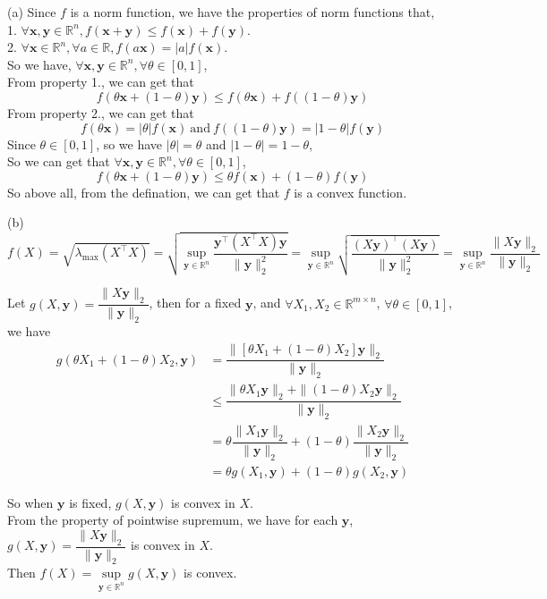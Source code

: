 (a) Since $f$ is a norm function, we have the properties of norm functions that,\\
1. $\forall \mathbf{x},\mathbf{y}\in \mathbb{R}^{n}, f(\mathbf{x}+\mathbf{y})\leq f(\mathbf{x})+f(\mathbf{y})$.\\
2. $\forall \mathbf{x}\in \mathbb{R}^{n}, \forall a \in \mathbb{R}, f(a\mathbf{x})=|a|f(\mathbf{x})$.\\
So we have, $\forall \mathbf{x},\mathbf{y}\in \mathbb{R}^{n}, \forall \theta \in [0,1]$,\\
From property 1., we can get that
$$f(\theta \mathbf{x}+(1-\theta)\mathbf{y})\leq f(\theta \mathbf{x})+f((1-\theta)\mathbf{y})$$
From property 2., we can get that
$$f(\theta \mathbf{x})=|\theta|f(\mathbf{x})\ \text{and}\ f((1-\theta)\mathbf{y})=|1-\theta|f(\mathbf{y})$$
Since $\theta \in [0,1]$, so we have $|\theta|=\theta$ and $|1-\theta|=1-\theta$,\\
So we can get that $\forall \mathbf{x},\mathbf{y}\in \mathbb{R}^{n}, \forall \theta \in [0,1]$,
$$f(\theta \mathbf{x}+(1-\theta)\mathbf{y})\leq \theta f(\mathbf{x})+(1-\theta)f(\mathbf{y})$$
So above all, from the defination, we can get that $f$ is a convex function.



(b) $f(X)=\sqrt{\lambda_{\max}(X^{\top}X)} = \sqrt{\sup\limits_{\mathbf{y}\in\mathbb{R}^n}\dfrac{\mathbf{y}^{\top}(X^{\top}X)\mathbf{y}}{\|\mathbf{y}\|_2^2}}= \sup\limits_{\mathbf{y}\in\mathbb{R}^n}\sqrt{\dfrac{(X\mathbf{y})^{\top}(X\mathbf{y})}{\|\mathbf{y}\|_2^2}} = \sup\limits_{\mathbf{y}\in\mathbb{R}^n}\dfrac{\|X\mathbf{y}\|_2}{\|\mathbf{y}\|_2}$

Let $g(X,\mathbf{y})=\dfrac{\|X\mathbf{y}\|_2}{\|\mathbf{y}\|_2}$, then for a fixed $\mathbf{y}$, and $\forall X_1, X_2\in\mathbb{R}^{m\times n}$, $\forall \theta\in[0,1]$, we have
\begin{align*}
g(\theta X_1+(1-\theta)X_2,\mathbf{y}) &= \dfrac{\|\left[\theta X_1+(1-\theta)X_2\right]\mathbf{y}\|_2}{\|\mathbf{y}\|_2} \\
&\leq \dfrac{\|\theta X_1\mathbf{y}\|_2+\|(1-\theta)X_2\mathbf{y}\|_2}{\|\mathbf{y}\|_2} \\
&= \theta\dfrac{\|X_1\mathbf{y}\|_2}{\|\mathbf{y}\|_2}+(1-\theta)\dfrac{\|X_2\mathbf{y}\|_2}{\|\mathbf{y}\|_2} \\
&= \theta g(X_1,\mathbf{y})+(1-\theta)g(X_2,\mathbf{y})
\end{align*}

So when $\mathbf{y}$ is fixed, $g(X,\mathbf{y})$ is convex in $X$.\\
From the property of pointwise supremum, we have for each $\mathbf{y}$, $g(X,\mathbf{y})=\dfrac{\|X\mathbf{y}\|_2}{\|\mathbf{y}\|_2}$ is convex in $X$. \\
Then $f(X)=\sup\limits_{\mathbf{y}\in\mathbb{R}^n}g(X,\mathbf{y})$ is convex.


